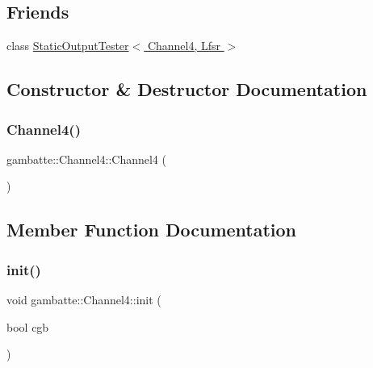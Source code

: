 \subsection*{Friends}
\begin{DoxyCompactItemize}
\item 
class \hyperlink{classgambatte_1_1Channel4_acf79fbb08fa62daf487648e7d1d91458}{Static\+Output\+Tester$<$ Channel4, Lfsr $>$}
\end{DoxyCompactItemize}


\subsection{Constructor \& Destructor Documentation}
\mbox{\label{classgambatte_1_1Channel4_a54ef50ebeae47194401f0ef3b9a42779}} 
\subsubsection{\texorpdfstring{Channel4()}{Channel4()}}
{\footnotesize\ttfamily gambatte\+::\+Channel4\+::\+Channel4 (\begin{DoxyParamCaption}{ }\end{DoxyParamCaption})}



\subsection{Member Function Documentation}
\mbox{\label{classgambatte_1_1Channel4_ac7c73d2ecf5f29b8ead9497d593602cb}} 
\subsubsection{\texorpdfstring{init()}{init()}}
{\footnotesize\ttfamily void gambatte\+::\+Channel4\+::init (\begin{DoxyParamCaption}\item[{bool}]{cgb }\end{DoxyParamCaption})}

\mbox{\label{classgambatte_1_1Channel4_a5e0e0a8fd225f1547683f813639f8ec3}} 

